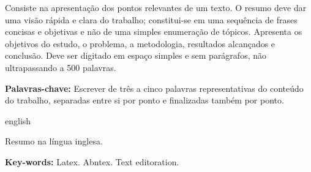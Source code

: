 \begin{resumo}
\noindent
Consiste na apresentação dos pontos relevantes de um texto. O resumo deve dar uma visão rápida e clara do trabalho; constitui-se em uma sequência de frases concisas e objetivas e não de uma simples enumeração de tópicos. Apresenta os objetivos do estudo, o problema, a metodologia, resultados alcançados e conclusão. Deve ser digitado em espaço simples e sem parágrafos, não ultrapassando a 500 palavras.

 \vspace{0.2cm}

 
 \textbf{Palavras-chave:} Escrever de três a cinco palavras representativas do conteúdo do trabalho, separadas entre si por ponto e finalizadas também por ponto.
\end{resumo}

\begin{resumo}[Abstract]	
 	\begin{otherlanguage*}{english}
 	\noindent 

	Resumo na língua inglesa. %

   \vspace{0.2cm}
 
   
    \textbf{Key-words:} Latex. Abntex. Text editoration.	
 	\end{otherlanguage*}
\end{resumo}